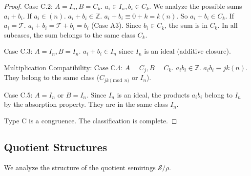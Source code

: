 \documentclass[11pt, a4paper]{article}
\theoremstyle{plain}
\theoremstyle{definition}
\numberwithin{equation}{section}
\newcommand{\Z}{\mathbb{Z}}
\newcommand{\Tobj}{\mathcal{T}} %
\newcommand{\SemiringS}{\mathcal{S}}
\begin{document}
\begin{proof}
Case C.2: $A=I_n, B=C_k$. $a_i \in I_n, b_i \in C_k$.
We analyze the possible sums $a_i+b_i$.
If $a_i \in (n)$. $a_i+b_i \in \Z$. $a_i+b_i \equiv 0+k=k(n)$. So $a_i+b_i \in C_k$.
If $a_i = \Tobj$. $a_i+b_i = \Tobj+b_i = b_i$ (Case A3). Since $b_i \in C_k$, the sum is in $C_k$.
In all subcases, the sum belongs to the same class $C_k$.

Case C.3: $A=I_n, B=I_n$. $a_i+b_i \in I_n$ since $I_n$ is an ideal (additive closure).

Multiplication Compatibility:
Case C.4: $A=C_j, B=C_k$. $a_i b_i \in \Z$. $a_i b_i \equiv jk(n)$. They belong to the same class ($C_{jk \pmod{n}}$ or $I_n$).

Case C.5: $A=I_n$ or $B=I_n$. Since $I_n$ is an ideal, the products $a_i b_i$ belong to $I_n$ by the absorption property. They are in the same class $I_n$.

Type C is a congruence. The classification is complete.
\end{proof}

\subsection{Quotient Structures}

We analyze the structure of the quotient semirings $\SemiringS/\rho$.
\end{document}
